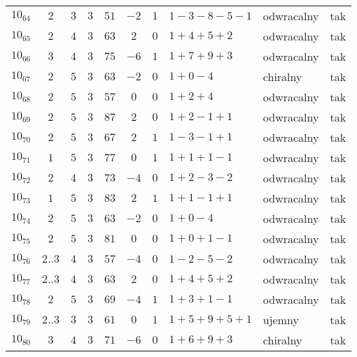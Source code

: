 \begin{longtable}{lccccccllc}
$10_{64}$   &  $2$     &  $3$  &  $3$      &  $51$   &  $-2$  &  $1$  &  $1-3-8-5-1$    &  odwracalny  &  tak  \\
$10_{65}$   &  $2$     &  $4$  &  $3$      &  $63$   &  $2$   &  $0$  &  $1+4+5+2$      &  odwracalny  &  tak  \\
$10_{66}$   &  $3$     &  $4$  &  $3$      &  $75$   &  $-6$  &  $1$  &  $1+7+9+3$      &  odwracalny  &  tak  \\
$10_{67}$   &  $2$     &  $5$  &  $3$      &  $63$   &  $-2$  &  $0$  &  $1+0-4$        &  chiralny    &  tak  \\
$10_{68}$   &  $2$     &  $5$  &  $3$      &  $57$   &  $0$   &  $0$  &  $1+2+4$        &  odwracalny  &  tak  \\
$10_{69}$   &  $2$     &  $5$  &  $3$      &  $87$   &  $2$   &  $0$  &  $1+2-1+1$      &  odwracalny  &  tak  \\
$10_{70}$   &  $2$     &  $5$  &  $3$      &  $67$   &  $2$   &  $1$  &  $1-3-1+1$      &  odwracalny  &  tak  \\
$10_{71}$   &  $1$     &  $5$  &  $3$      &  $77$   &  $0$   &  $1$  &  $1+1+1-1$      &  odwracalny  &  tak  \\
$10_{72}$   &  $2$     &  $4$  &  $3$      &  $73$   &  $-4$  &  $0$  &  $1+2-3-2$      &  odwracalny  &  tak  \\
$10_{73}$   &  $1$     &  $5$  &  $3$      &  $83$   &  $2$   &  $1$  &  $1+1-1+1$      &  odwracalny  &  tak  \\
$10_{74}$   &  $2$     &  $5$  &  $3$      &  $63$   &  $-2$  &  $0$  &  $1+0-4$        &  odwracalny  &  tak  \\
$10_{75}$   &  $2$     &  $5$  &  $3$      &  $81$   &  $0$   &  $0$  &  $1+0+1-1$      &  odwracalny  &  tak  \\
$10_{76}$   &  $2..3$  &  $4$  &  $3$      &  $57$   &  $-4$  &  $0$  &  $1-2-5-2$      &  odwracalny  &  tak  \\
$10_{77}$   &  $2..3$  &  $4$  &  $3$      &  $63$   &  $2$   &  $0$  &  $1+4+5+2$      &  odwracalny  &  tak  \\
$10_{78}$   &  $2$     &  $5$  &  $3$      &  $69$   &  $-4$  &  $1$  &  $1+3+1-1$      &  odwracalny  &  tak  \\
$10_{79}$   &  $2..3$  &  $3$  &  $3$      &  $61$   &  $0$   &  $1$  &  $1+5+9+5+1$    &  ujemny      &  tak  \\
$10_{80}$   &  $3$     &  $4$  &  $3$      &  $71$   &  $-6$  &  $0$  &  $1+6+9+3$      &  chiralny    &  tak  \\

\end{longtable}
